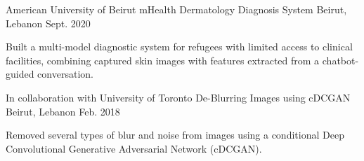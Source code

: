 

\begin{cventries}


  \cventry
    {American University of Beirut} %
    {mHealth Dermatology Diagnosis System} %
    {Beirut, Lebanon} %
    {Sept. 2020} %
    {
      \begin{cvitems} %
        \item {Built a multi-model diagnostic system for refugees with limited access to clinical facilities, combining captured skin images with features extracted from a chatbot-guided conversation.}
      \end{cvitems}
    }

  \cventry
    {In collaboration with University of Toronto} %
    {De-Blurring Images using cDCGAN} %
    {Beirut, Lebanon} %
    {Feb. 2018} %
    {
      \begin{cvitems} %
        \item {Removed several types of blur and noise from images using a conditional Deep Convolutional Generative Adversarial Network (cDCGAN).}
      \end{cvitems}
    }


\end{cventries}
